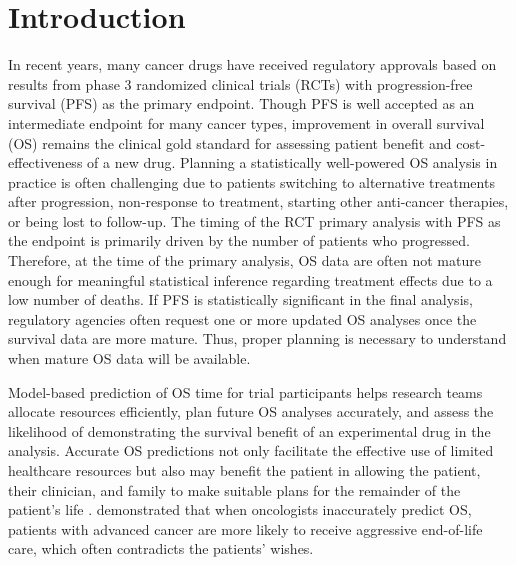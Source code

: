 \documentclass[aoas]{imsart}
\theoremstyle{plain}
\theoremstyle{remark}
\begin{document}
\begin{frontmatter}
\begin{keyword}
\end{keyword}

\end{frontmatter}

\section{Introduction}

In recent years, many cancer drugs have received regulatory approvals based on results from phase 3 randomized clinical trials (RCTs) with progression-free survival (PFS) as the primary endpoint. Though PFS is well accepted as an intermediate endpoint for many cancer types, improvement in overall survival (OS) remains the clinical gold standard for assessing patient benefit \citep{tang2007surrogate, driscoll2009overall, methy2010surrogate, grigore2020surrogate} and cost-effectiveness \citep{royle2023overall} of a new drug. Planning a statistically well-powered OS analysis in practice is often challenging due to patients switching to alternative treatments after progression, non-response to treatment, starting other anti-cancer therapies, or being lost to follow-up. The timing of the RCT primary analysis with PFS as the endpoint is primarily driven by the number of patients who progressed. Therefore, at the time of the primary analysis, OS data are often not mature enough for meaningful statistical inference regarding treatment effects due to a low number of deaths. If PFS is statistically significant in the final analysis, regulatory agencies often request one or more updated OS analyses once the survival data are more mature. Thus, proper planning is necessary to understand when mature OS data will be available.
 
Model-based prediction of OS time for trial participants helps research teams allocate resources efficiently, plan future OS analyses accurately, and assess the likelihood of demonstrating the survival benefit of an experimental drug in the analysis. Accurate OS predictions not only facilitate the effective use of limited healthcare resources but also may benefit the patient in allowing the patient, their clinician, and family to make suitable plans for the remainder of the patient's life \citep{mackillop1997measuring}. \cite{sborov2019impact} demonstrated that when oncologists inaccurately predict OS, patients with advanced cancer are more likely to receive aggressive end-of-life care, which often contradicts the patients' wishes. 
\end{document}
